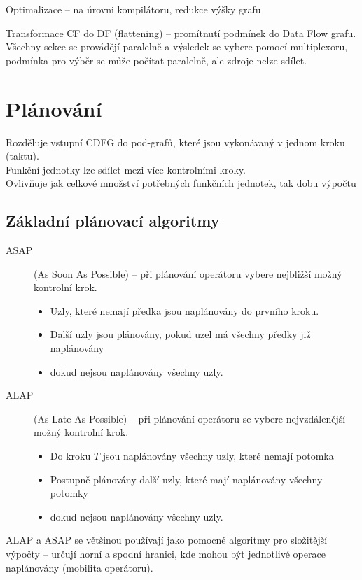 \documentclass[a4paper, 11pt]{report}
\begin{document}
Optimalizace -- na úrovni kompilátoru, redukce výšky grafu

Transformace CF do DF (flattening) -- promítnutí podmínek do Data Flow grafu.
Všechny sekce se provádějí paralelně a výsledek se vybere pomocí multiplexoru, podmínka pro výběr se může počítat paralelně, ale zdroje nelze sdílet.

\section{Plánování}

Rozděluje vstupní CDFG do pod-grafů, které jsou vykonávaný v jednom kroku (taktu).\\
Funkční jednotky lze sdílet mezi více kontrolními kroky.\\
Ovlivňuje jak celkové množství potřebných funkčních jednotek, tak dobu výpočtu

\subsection{Základní plánovací algoritmy}
\begin{description}
	\item[ASAP] (As Soon As Possible) -- při plánování operátoru vybere nejbližší možný kontrolní krok.
	\begin{itemize}
		\item Uzly, které nemají předka jsou naplánovány do prvního kroku.
		\item Další uzly jsou plánovány, pokud uzel má všechny předky již naplánovány
		\item dokud nejsou naplánovány všechny uzly.
	\end{itemize}
	\item[ALAP] (As Late As Possible) -- při plánování operátoru se vybere nejvzdálenější možný kontrolní krok.
	\begin{itemize}
		\item Do kroku $T$ jsou naplánovány všechny uzly, které nemají potomka
		\item Postupně plánovány další uzly, které mají naplánovány všechny potomky
		\item dokud nejsou naplánovány všechny uzly.
	\end{itemize}
\end{description}
ALAP a ASAP se většinou používají jako pomocné algoritmy pro složitější výpočty -- určují horní a spodní hranici, kde mohou být jednotlivé operace naplánovány (mobilita operátoru).
\end{document}
